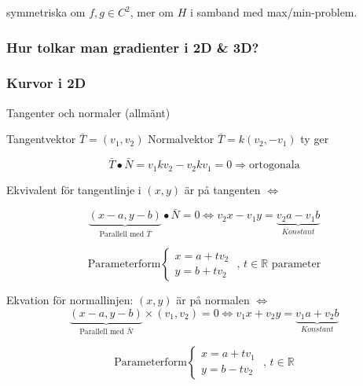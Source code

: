 \documentclass{article}
\begin{document}
symmetriska om \(f,g \in C^2\), mer om \(H\) i samband med max/min-problem.

\subsubsection{Hur tolkar man gradienter i 2D \& 3D?}

\subsubsection*{Kurvor i 2D}

Tangenter och normaler (allmänt)

Tangentvektor \(\bar{T} = (v_1,v_2)\) \newline
Normalvektor \(\bar{T} = k(v_2,-v_1)\) ty ger \newline

\[\bar{T} \bullet \bar{N} = v_1kv_2 - v_2kv_1 = 0 \Rightarrow \text{ortogonala}\]

Ekvivalent för tangentlinje i \((x,y)\) är på tangenten \(\iff\) \newline

\[\underbrace{(x-a,y-b)}_{\text{Parallell med }\bar{T}} \bullet \bar{N} = 0 \iff v_2x - v_1y = \underbrace{v_2a - v_1b}_{Konstant}\]

\[
	\text{Parameterform} 
	\left\{\begin{array}{rcl}
		x=a+tv_2 \\
		y=b+tv_2
	\end{array}\right.
	\text{ , } t \in \mathbb{R} \text{ parameter}
\]

Ekvation för normallinjen: \((x,y)\) är på normalen \(\iff\)
\[
	\underbrace{(x-a,y-b)}_{\text{Parallell med }\bar{N}} \times (v_1,v_2) = 0 \iff v_1x + v_2y = \underbrace{v_1a + v_2b}_{Konstant}
\]

\[
	\text{Parameterform} 
	\left\{\begin{array}{rcl}
		x=a+tv_1 \\
		y=b-tv_2
	\end{array}\right.
	\text{ , } t \in \mathbb{R}
\]
\end{document}
